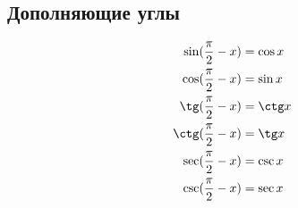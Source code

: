 \subsection*{Дополняющие углы}

\begin{align*}
  \sin(\frac{\pi}{2} - x) &= \cos x\\
  \cos(\frac{\pi}{2} - x) &= \sin x\\
  \tg(\frac{\pi}{2} - x) &= \ctg x\\
  \ctg(\frac{\pi}{2} - x) &= \tg x\\
  \sec(\frac{\pi}{2} - x) &= \csc x\\
  \csc(\frac{\pi}{2} - x) &= \sec x
\end{align*}